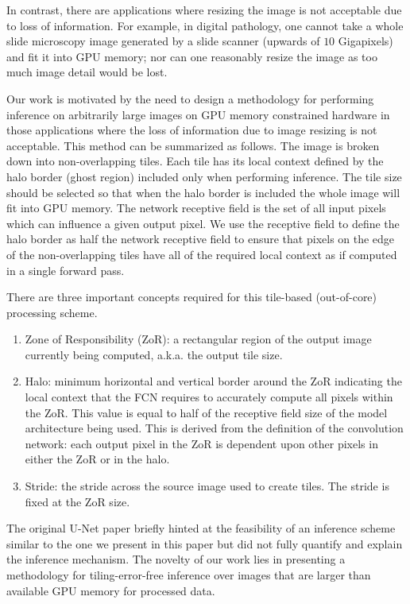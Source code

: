 \documentclass[10pt, indentfirst]{article}
\begin{document}
In contrast, there are applications where resizing the image is not acceptable due to loss of information.
For example, in digital pathology, one cannot take a whole slide microscopy image generated by a slide scanner (upwards of $\num{10}$ Gigapixels) and fit it into GPU memory; nor can one reasonably resize the image as too much image detail would be lost. 

Our work is motivated by the need to design a methodology for performing inference on arbitrarily large images on GPU memory constrained hardware in those applications where the loss of information due to image resizing is not acceptable.
This method can be summarized as follows.
The image is broken down into non-overlapping tiles.
Each tile has its local context defined by the halo border (ghost region) included only when performing inference.
The tile size should be selected so that when the halo border is included the whole image will fit into GPU memory.
The network receptive field \citep{araujo2019computing} is the set of all input pixels which can influence a given output pixel.
We use the receptive field to define the halo border as half the network receptive field to ensure that pixels on the edge of the non-overlapping tiles have all of the required local context as if computed in a single forward pass.

There are three important concepts required for this tile-based (out-of-core) processing scheme.
\begin{enumerate}
	\item Zone of Responsibility (ZoR): a rectangular region of the output image currently being computed, a.k.a. the output tile size.
	\item Halo: minimum horizontal and vertical border around the ZoR indicating the local context that the FCN requires to accurately compute all pixels within the ZoR.
	This value is equal to half of the receptive field size of the model architecture being used.
	This is derived from the definition of the convolution network: each output pixel in the ZoR is dependent upon other pixels in either the ZoR or in the halo.
	\item Stride: the stride across the source image used to create tiles.
	The stride is fixed at the ZoR size.
\end{enumerate}

The original U-Net paper \citep{Ronneberger2015a} briefly hinted at the feasibility of an inference scheme similar to the one we present in this paper but did not fully quantify and explain the inference mechanism.
The novelty of our work lies in presenting a methodology for tiling-error-free inference over images that are larger than available GPU memory for processed data.
\end{document}
